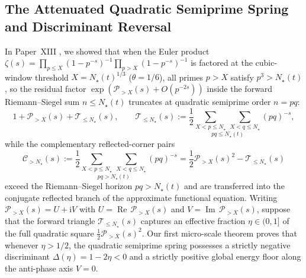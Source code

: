\documentclass[11pt,reqno]{amsart}
\theoremstyle{definition}
\theoremstyle{remark}
\numberwithin{equation}{section}
\newcommand{\ii}{\mathrm{i}}
\newcommand{\RePt}{\operatorname{Re}}
\newcommand{\ImPt}{\operatorname{Im}}
\begin{document}
\subsection{The Attenuated Quadratic Semiprime Spring and Discriminant Reversal}\label{subsec:attenuated-spring}

In Paper~XIII \cite{Missiaen2026P13}, we showed that when the Euler product $\zeta(s) = \prod_{p \le X}(1-p^{-s})^{-1}\prod_{p > X}(1-p^{-s})^{-1}$ is factored at the cubic-window threshold $X = N_\star(t)^{1/3}$ ($\theta = 1/6$), all primes $p > X$ satisfy $p^3 > N_\star(t)$, so the residual factor $\exp(\mathcal{P}_{>X}(s) + O(p^{-2s}))$ inside the forward Riemann--Siegel sum $n \le N_\star(t)$ truncates at quadratic semiprime order $n = pq$:
\begin{equation}\label{eq:forward-truncation}
1 + \mathcal{P}_{>X}(s) + \mathcal{T}_{\le N_\star}(s), \qquad \mathcal{T}_{\le N_\star}(s) := \frac{1}{2}\underset{pq \le N_\star(t)}{\sum_{X < p \le N_\star}\,\sum_{X < q \le N_\star}} (pq)^{-s},
\end{equation}
while the complementary reflected-corner pairs
\begin{equation}\label{eq:reflected-corner-def}
\mathcal{C}_{>N_\star}(s) := \frac{1}{2}\underset{pq > N_\star(t)}{\sum_{X < p \le N_\star}\,\sum_{X < q \le N_\star}} (pq)^{-s} = \frac{1}{2}\mathcal{P}_{>X}(s)^2 - \mathcal{T}_{\le N_\star}(s)
\end{equation}
exceed the Riemann--Siegel horizon $pq > N_\star(t)$ and are transferred into the conjugate reflected branch of the approximate functional equation. Writing $\mathcal{P}_{>X}(s) = U + \ii V$ with $U = \RePt\,\mathcal{P}_{>X}(s)$ and $V = \ImPt\,\mathcal{P}_{>X}(s)$, suppose that the forward triangle $\mathcal{T}_{\le N_\star}(s)$ captures an effective fraction $\eta \in (0,1]$ of the full quadratic square $\frac{1}{2}\mathcal{P}_{>X}(s)^2$. Our first micro-scale theorem proves that whenever $\eta > 1/2$, the quadratic semiprime spring possesses a strictly negative discriminant $\Delta(\eta) = 1 - 2\eta < 0$ and a strictly positive global energy floor along the anti-phase axis $V=0$.
\end{document}
